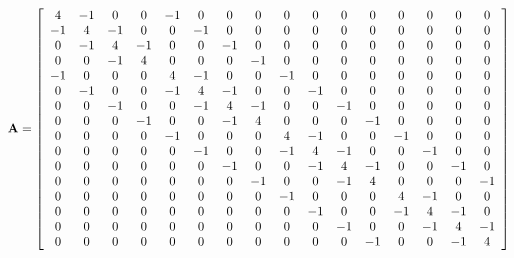 \documentclass{article}
\begin{document}
\thispagestyle{empty}
\[
\mathbf{A} = \left[ \begin{array}{c c c c c c c c c c c c c c c c }
 4 & -1 &  0 &  0 & -1 &  0 &  0 &  0 &  0 &  0 &  0 &  0 &  0 &  0 &  0 &  0\\
-1 &  4 & -1 &  0 &  0 & -1 &  0 &  0 &  0 &  0 &  0 &  0 &  0 &  0 &  0 &  0\\
 0 & -1 &  4 & -1 &  0 &  0 & -1 &  0 &  0 &  0 &  0 &  0 &  0 &  0 &  0 &  0\\
 0 &  0 & -1 &  4 &  0 &  0 &  0 & -1 &  0 &  0 &  0 &  0 &  0 &  0 &  0 &  0\\
-1 &  0 &  0 &  0 &  4 & -1 &  0 &  0 & -1 &  0 &  0 &  0 &  0 &  0 &  0 &  0\\
 0 & -1 &  0 &  0 & -1 &  4 & -1 &  0 &  0 & -1 &  0 &  0 &  0 &  0 &  0 &  0\\
 0 &  0 & -1 &  0 &  0 & -1 &  4 & -1 &  0 &  0 & -1 &  0 &  0 &  0 &  0 &  0\\
 0 &  0 &  0 & -1 &  0 &  0 & -1 &  4 &  0 &  0 &  0 & -1 &  0 &  0 &  0 &  0\\
 0 &  0 &  0 &  0 & -1 &  0 &  0 &  0 &  4 & -1 &  0 &  0 & -1 &  0 &  0 &  0\\
 0 &  0 &  0 &  0 &  0 & -1 &  0 &  0 & -1 &  4 & -1 &  0 &  0 & -1 &  0 &  0\\
 0 &  0 &  0 &  0 &  0 &  0 & -1 &  0 &  0 & -1 &  4 & -1 &  0 &  0 & -1 &  0\\
 0 &  0 &  0 &  0 &  0 &  0 &  0 & -1 &  0 &  0 & -1 &  4 &  0 &  0 &  0 & -1\\
 0 &  0 &  0 &  0 &  0 &  0 &  0 &  0 & -1 &  0 &  0 &  0 &  4 & -1 &  0 &  0\\
 0 &  0 &  0 &  0 &  0 &  0 &  0 &  0 &  0 & -1 &  0 &  0 & -1 &  4 & -1 &  0\\
 0 &  0 &  0 &  0 &  0 &  0 &  0 &  0 &  0 &  0 & -1 &  0 &  0 & -1 &  4 & -1\\
 0 &  0 &  0 &  0 &  0 &  0 &  0 &  0 &  0 &  0 &  0 & -1 &  0 &  0 & -1 &  4
\end{array}\right]
\]
\end{document}
